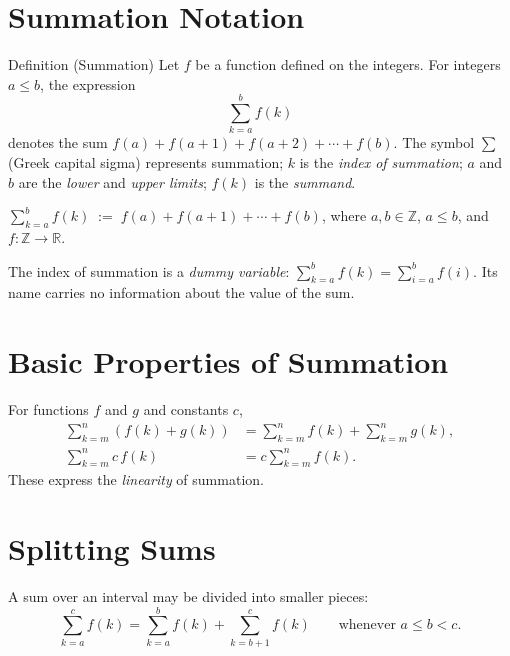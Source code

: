 
\section{Summation Notation}

\begin{definitionbox}{Definition (Summation)}
Let \(f\) be a function defined on the integers.
For integers \(a \le b\), the expression
\[
\sum_{k=a}^{b} f(k)
\]
denotes the sum \(f(a) + f(a+1) + f(a+2) + \cdots + f(b)\).
The symbol \(\sum\) (Greek capital sigma) represents summation;
\(k\) is the \emph{index of summation}; \(a\) and \(b\) are the
\emph{lower} and \emph{upper limits}; \(f(k)\) is the \emph{summand}.
\end{definitionbox}
\label{def:summation}

\begin{remark*}
\(\displaystyle\sum_{k=a}^{b} f(k) \;:=\; f(a) + f(a+1) + \cdots + f(b)\),
where \(a,b \in \mathbb{Z}\), \(a \le b\), and \(f : \mathbb{Z}\to\mathbb{R}\).
\end{remark*}

\begin{remark*}
The index of summation is a \emph{dummy variable}:
\(\displaystyle\sum_{k=a}^{b} f(k) = \sum_{i=a}^{b} f(i)\).
Its name carries no information about the value of the sum.
\end{remark*}

\section*{Basic Properties of Summation}

For functions \(f\) and \(g\) and constants \(c\),
\begin{align*}
\sum_{k=m}^{n} (f(k) + g(k))
&=
\sum_{k=m}^{n} f(k)
+
\sum_{k=m}^{n} g(k), \\[6pt]
\sum_{k=m}^{n} c\,f(k)
&=
c \sum_{k=m}^{n} f(k).
\end{align*}
These express the \emph{linearity} of summation.

\section*{Splitting Sums}

A sum over an interval may be divided into smaller pieces:
\[
\sum_{k=a}^{c} f(k)
=
\sum_{k=a}^{b} f(k)
+
\sum_{k=b+1}^{c} f(k)
\qquad \text{whenever } a \le b < c.
\]

